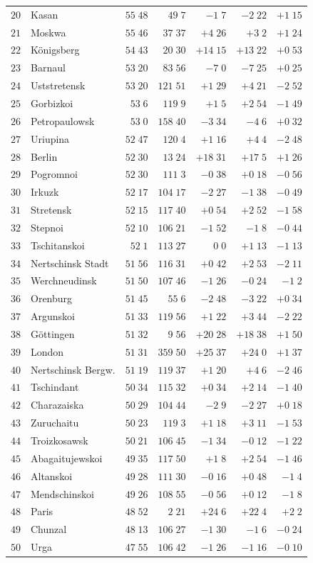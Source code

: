 \begin{center}
{{\begin{tabular}{r|l||r|r||r|r|r}
$20$&Kasan&$55\;48$&$49\;7$&$-1\;7$&$-2\;22$&$+1\;15$\\[2pt]
$21$&Moskwa&$55\;46$&$37\;37$&$+4\;26$&$+3\;2$&$+1\;24$\\
$22$&Königsberg&$54\;43$&$20\;30$&$+14\;15$&$+13\;22$&$+0\;53$\\
$23$&Barnaul&$53\;20$&$83\;56$&$-7\;0$&$-7\;25$&$+0\;25$\\
$24$&Uststretensk&$53\;20$&$121\;51$&$+1\;29$&$+4\;21$&$-2\;52$\\
$25$&Gorbizkoi&$53\;6$&$119\;9$&$+1\;5$&$+2\;54$&$-1\;49$\\
$26$&Petropaulowsk&$53\;0$&$158\;40$&$-3\;34$&$-4\;6$&$+0\;32$\\
$27$&Uriupina&$52\;47$&$120\;4$&$+1\;16$&$+4\;4$&$-2\;48$\\
$28$&Berlin&$52\;30$&$13\;24$&$+18\;31$&$+17\;5$&$+1\;26$\\
$29$&Pogromnoi&$52\;30$&$111\;3$&$-0\;38$&$+0\;18$&$-0\;56$\\
$30$&Irkuzk&$52\;17$&$104\;17$&$-2\;27$&$-1\;38$&$-0\;49$\\[2pt]
$31$&Stretensk&$52\;15$&$117\;40$&$+0\;54$&$+2\;52$&$-1\;58$\\
$32$&Stepnoi&$52\;10$&$106\;21$&$-1\;52$&$-1\;8$&$-0\;44$\\
$33$&Tschitanskoi&$52\;1$&$113\;27$&$0\;0$&$+1\;13$&$-1\;13$\\
$34$&Nertschinsk Stadt&$51\;56$&$116\;31$&$+0\;42$&$+2\;53$&$-2\;11$\\
$35$&Werchneudinsk&$51\;50$&$107\;46$&$-1\;26$&$-0\;24$&$-1\;2$\\
$36$&Orenburg&$51\;45$&$55\;6$&$-2\;48$&$-3\;22$&$+0\;34$\\
$37$&Argunskoi&$51\;33$&$119\;56$&$+1\;22$&$+3\;44$&$-2\;22$\\
$38$&Göttingen&$51\;32$&$9\;56$&$+20\;28$&$+18\;38$&$+1\;50$\\
$39$&London&$51\;31$&$359\;50$&$+25\;37$&$+24\;0$&$+1\;37$\\
$40$&Nertschinsk Bergw.&$51\;19$&$119\;37$&$+1\;20$&$+4\;6$&$-2\;46$\\[2pt]
$41$&Tschindant&$50\;34$&$115\;32$&$+0\;34$&$+2\;14$&$-1\;40$\\
$42$&Charazaiska&$50\;29$&$104\;44$&$-2\;9$&$-2\;27$&$+0\;18$\\
$43$&Zuruchaitu&$50\;23$&$119\;3$&$+1\;18$&$+3\;11$&$-1\;53$\\
$44$&Troizkosawsk&$50\;21$&$106\;45$&$-1\;34$&$-0\;12$&$-1\;22$\\
$45$&Abagaitujewskoi&$49\;35$&$117\;50$&$+1\;8$&$+2\;54$&$-1\;46$\\
$46$&Altanskoi&$49\;28$&$111\;30$&$-0\;16$&$+0\;48$&$-1\;4$\\
$47$&Mendschinskoi&$49\;26$&$108\;55$&$-0\;56$&$+0\;12$&$-1\;8$\\
$48$&Paris&$48\;52$&$2\;21$&$+24\;6$&$+22\;4$&$+2\;2$\\
$49$&Chunzal&$48\;13$&$106\;27$&$-1\;30$&$-1\;6$&$-0\;24$\\
$50$&Urga&$47\;55$&$106\;42$&$-1\;26$&$-1\;16$&$-0\;10$\\
\end{tabular}
}
}
\end{center}
